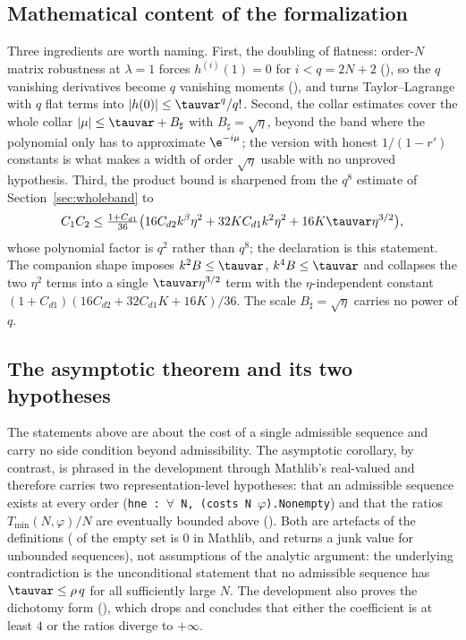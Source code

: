 \subsection{Mathematical content of the formalization}

Three ingredients are worth naming. First, the doubling of flatness: order-$N$ matrix robustness at $\lambda=1$ forces $h^{(i)}(1)=0$ for
$i<q=2N+2$ (), so the $q$ vanishing derivatives become $q$ vanishing moments
(), and  turns Taylor--Lagrange with $q$ flat
terms into $|h(0)|\le\tauvar^{q}/q!$. Second, the collar estimates cover the whole collar
$|\mu|\le\tauvar+B_\sharp$ with $B_\sharp=\sqrt\eta$, beyond the band where the polynomial only has to
approximate $\e^{-i\mu}$; the version with honest $1/(1-r')$ constants is what makes a width of
order $\sqrt\eta$ usable with no unproved hypothesis. Third, the product bound is sharpened from
the $q^{8}$ estimate of Section~\ref{sec:wholeband} to
\begin{equation}
C_1C_2\le\tfrac{1+C_{d1}}{36}
\bigl(16C_{d2}k^{\beta}\eta^{2}+32KC_{d1}k^{2}\eta^{2}+16K\tauvar\eta^{3/2}\bigr),
\label{eq:formal-product}
\end{equation}
whose polynomial factor is $q^{2}$ rather than $q^{8}$; the declaration
\hspace{0pt} is this statement. The companion
shape \hspace{0pt} imposes $k^{2}B\le\tauvar$,
$k^{4}B\le\tauvar$ and collapses the two $\eta^{2}$ terms into a single $\tauvar\eta^{3/2}$ term
with the $\eta$-independent constant $(1+C_{d1})(16C_{d2}+32C_{d1}K+16K)/36$. The scale
$B_\sharp=\sqrt\eta$ carries no power of $q$.

\subsection{The asymptotic theorem and its two hypotheses}

The statements above are about the cost of a single admissible sequence and carry no side condition
beyond admissibility. The asymptotic corollary, by contrast, is phrased in the development through
Mathlib's real-valued  and therefore carries two representation-level
hypotheses: that an admissible sequence exists at every order
(\texttt{hne : $\forall$ N, (costs N $\varphi$).Nonempty}) and that the ratios $T_{\min}(N,\varphi)/N$
are eventually bounded above (). Both are artefacts of the definitions
( of the empty set is $0$ in Mathlib, and  returns a junk value for
unbounded sequences), not assumptions of the analytic argument: the underlying contradiction is the
unconditional statement that no admissible sequence has $\tauvar\le\rho\,q$ for all sufficiently
large $N$. The development also proves the dichotomy form
(), which drops  and concludes that either the
coefficient is at least $4$ or the ratios diverge to $+\infty$.

